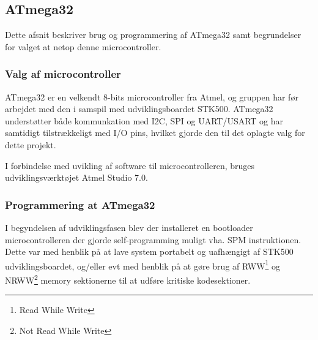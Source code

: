 \subsection{ATmega32}

Dette afsnit beskriver brug og programmering af ATmega32 samt begrundelser for valget at netop denne microcontroller.

\subsubsection{Valg af microcontroller}

ATmega32 er en velkendt 8-bits microcontroller fra Atmel, og gruppen har før arbejdet med den i samspil med udviklingsboardet STK500.
ATmega32 understøtter både kommunkation med I2C, SPI og UART/USART og har samtidigt tilstrækkeligt med I/O pins, hvilket gjorde den til det oplagte valg for dette projekt.

I forbindelse med uvikling af software til microcontrolleren, bruges udviklingsværktøjet Atmel Studio 7.0.

\subsubsection{Programmering at ATmega32}

I begyndelsen af udviklingsfasen blev der installeret en bootloader microcontrolleren der 
gjorde self-programming muligt vha. SPM instruktionen. Dette var med henblik på at lave system portabelt 
og uafhængigt af STK500 udviklingsboardet, og/eller evt med henblik på at gøre brug af RWW\footnote{Read While Write} og 
NRWW\footnote{Not Read While Write} memory sektionerne til at udføre kritiske kodesektioner.



